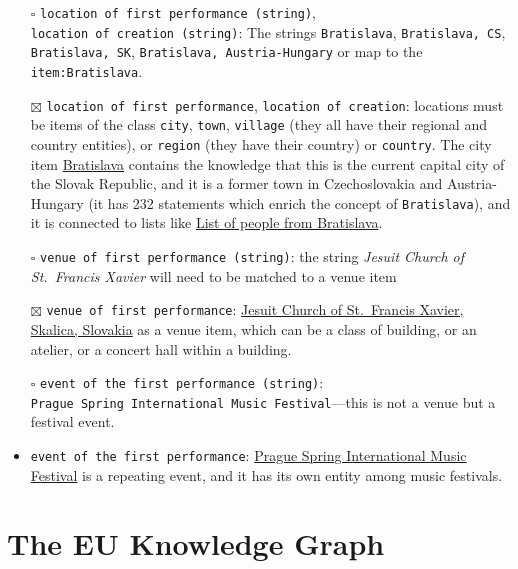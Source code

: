 \documentclass[
  letterpaper,
  DIV=11,
  numbers=noendperiod]{scrreprt}
\begin{document}
\begin{itemize}
\item[$\square$]
  \texttt{location\ of\ first\ performance\ (string)},
  \texttt{location\ of\ creation\ (string)}: The strings
  \texttt{Bratislava}, \texttt{Bratislava,\ CS},
  \texttt{Bratislava,\ SK}, \texttt{Bratislava,\ Austria-Hungary} or map
  to the \texttt{item:Bratislava}.
\item[$\boxtimes$]
  \texttt{location\ of\ first\ performance},
  \texttt{location\ of\ creation}: locations must be items of the class
  \texttt{city}, \texttt{town}, \texttt{village} (they all have their
  regional and country entities), or \texttt{region} (they have their
  country) or \texttt{country}. The city item
  \href{https://www.wikidata.org/wiki/Q1780}{Bratislava} contains the
  knowledge that this is the current capital city of the Slovak
  Republic, and it is a former town in Czechoslovakia and
  Austria-Hungary (it has 232 statements which enrich the concept of
  \texttt{Bratislava}), and it is connected to lists like
  \href{https://en.wikipedia.org/wiki/List_of_people_from_Bratislava}{List
  of people from Bratislava}.
\item[$\square$]
  \texttt{venue\ of\ first\ performance\ (string)}: the string
  \emph{Jesuit Church of St.~Francis Xavier} will need to be matched to
  a venue item
\item[$\boxtimes$]
  \texttt{venue\ of\ first\ performance}:
  \href{https://reprexbase.eu/demowiki/index.php?title=Item:Q94}{Jesuit
  Church of St.~Francis Xavier, Skalica, Slovakia} as a venue item,
  which can be a class of building, or an atelier, or a concert hall
  within a building.
\item[$\square$]
  \texttt{event\ of\ the\ first\ performance\ (string)}:
  \texttt{Prague\ Spring\ International\ Music\ Festival}---this is not
  a venue but a festival event.
\item
  \texttt{event\ of\ the\ first\ performance}:
  \href{https://www.wikidata.org/wiki/Q1776937}{Prague Spring
  International Music Festival} is a repeating event, and it has its own
  entity among music festivals.
\end{itemize}

\section{The EU Knowledge Graph}\label{sec-eu-knowledge-graph}
\end{document}

